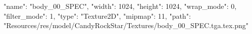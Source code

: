 {
  "name": "body_00_SPEC",
  "width": 1024,
  "height": 1024,
  "wrap_mode": 0,
  "filter_mode": 1,
  "type": "Texture2D",
  "mipmap": 11,
  "path": "Resources/res/model/CandyRockStar/Textures/body_00_SPEC.tga.tex.png"
}